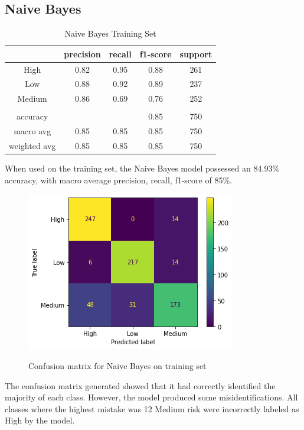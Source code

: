 \documentclass[runningheads]{llncs}
\begin{document}
\subsection{Naive Bayes}

\begin{table}[ht]
\centering
\caption{Naive Bayes Training Set} \vspace{0.25em}
\begin{tabular}{|c|c|c|c|c|} \hline
 & precision & recall & f1-score & support \\ \hline
High   & 0.82 & 0.95 & 0.88 & 261 \\ \hline
Low    & 0.88 & 0.92 & 0.89 & 237 \\ \hline
Medium & 0.86 & 0.69 & 0.76 & 252 \\ \hline
& & & & \\ \hline
accuracy     & & & 0.85 & 750 \\ \hline
macro avg    & 0.85 & 0.85 & 0.85 & 750 \\ \hline
weighted avg & 0.85 & 0.85 & 0.85 & 750 \\ \hline
\end{tabular}
\label{tab:naivebayes-training}
\end{table}

When used on the training set, the Naive Bayes model possessed an 84.93\% accuracy, with macro average precision, recall, f1-score of 85\%. 

\begin{figure}[ht]           	 
\centering               	 
\caption{Confusion matrix for Naive Bayes on training set}
\includegraphics[scale=0.5]{naivebayes-CM-training.png}  	 
\label{fig:naivebayes-CM-training}
\end{figure}

The confusion matrix generated showed that it had correctly identified the majority of each class. However, the model produced some misidentifications. All classes where the highest mistake was 12 Medium risk were incorrectly labeled as High by the model. 
\newpage
\end{document}
